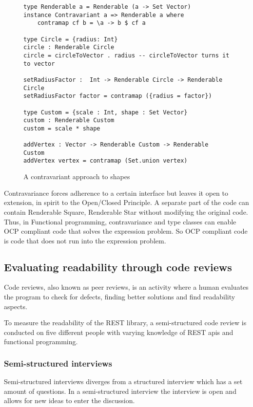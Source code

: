 \begin{figure}[H]
    \begin{lstlisting}
type Renderable a = Renderable (a -> Set Vector)
instance Contravariant a => Renderable a where
	contramap cf b = \a -> b $ cf a

type Circle = {radius: Int}
circle : Renderable Circle
circle = circleToVector . radius -- circleToVector turns it to vector

setRadiusFactor :  Int -> Renderable Circle -> Renderable Circle
setRadiusFactor factor = contramap ({radius = factor})

type Custom = {scale : Int, shape : Set Vector}
custom : Renderable Custom
custom = scale * shape

addVertex : Vector -> Renderable Custom -> Renderable Custom
addVertex vertex = contramap (Set.union vertex)
    \end{lstlisting}
    \caption{A contravariant approach to shapes}
    \label{contracircle}
\end{figure}

Contravariance forces adherence to a certain interface but leaves it open to
extension, in spirit to the Open/Closed Principle. A separate part of the
code can contain Renderable Square, Renderable Star without modifying the
original code. Thus, in Functional programming, contravariance and type classes
can enable OCP compliant code that solves the expression problem. 
So OCP compliant code is code that does not run into the expression problem.

\subsection{Evaluating readability through code reviews}

Code reviews, also known as peer reviews, is an activity where a human evaluates
the program to check for defects, finding better solutions and find readability
aspects. 

To measure the readability of the REST library, a semi-structured code review is
conducted on five different people with varying knowledge of REST apis and
functional programming.

\subsubsection{Semi-structured interviews}

Semi-structured interviews diverges from a structured interview which has a set
amount of questions. In a semi-structured interview the interview is open and
allows for new ideas to enter the discussion. 

